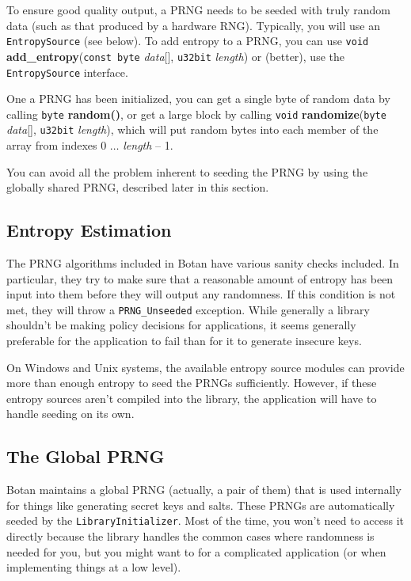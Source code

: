 \documentclass{article}
\newcommand{\function}[1]{\textbf{#1}}
\newcommand{\type}[1]{\texttt{#1}}
\renewcommand{\arg}[1]{\textsl{#1}}
\begin{document}
To ensure good quality output, a PRNG needs to be seeded with truly random data
(such as that produced by a hardware RNG). Typically, you will use an
\type{EntropySource} (see below). To add entropy to a PRNG, you can use
\type{void} \function{add\_entropy}(\type{const byte} \arg{data}[],
\type{u32bit} \arg{length}) or (better), use the \type{EntropySource}
interface.

One a PRNG has been initialized, you can get a single byte of random data by
calling \type{byte} \function{random()}, or get a large block by calling
\type{void} \function{randomize}(\type{byte} \arg{data}[], \type{u32bit}
\arg{length}), which will put random bytes into each member of the array from
indexes 0 $\ldots$ \arg{length} -- 1.

You can avoid all the problem inherent to seeding the PRNG by using the
globally shared PRNG, described later in this section.

\subsection{Entropy Estimation}

The PRNG algorithms included in Botan have various sanity checks included. In
particular, they try to make sure that a reasonable amount of entropy has been
input into them before they will output any randomness. If this condition is
not met, they will throw a \type{PRNG\_Unseeded} exception. While generally a
library shouldn't be making policy decisions for applications, it seems
generally preferable for the application to fail than for it to generate
insecure keys.

On Windows and Unix systems, the available entropy source modules can provide
more than enough entropy to seed the PRNGs sufficiently. However, if these
entropy sources aren't compiled into the library, the application will have to
handle seeding on its own.

\subsection{The Global PRNG}

Botan maintains a global PRNG (actually, a pair of them) that is used
internally for things like generating secret keys and salts. These PRNGs are
automatically seeded by the \type{LibraryInitializer}. Most of the time, you
won't need to access it directly because the library handles the common cases
where randomness is needed for you, but you might want to for a complicated
application (or when implementing things at a low level).
\end{document}
